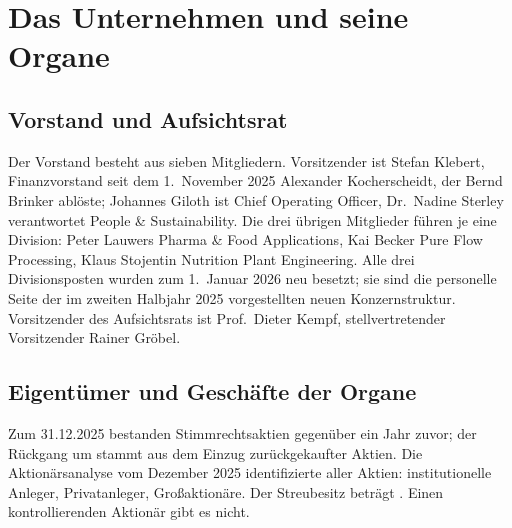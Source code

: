 \section{Das Unternehmen und seine Organe}
\label{sec:unternehmen}

\subsection{Vorstand und Aufsichtsrat}

Der Vorstand besteht aus sieben Mitgliedern. Vorsitzender ist Stefan Klebert, Finanzvorstand
seit dem 1.~November 2025 Alexander Kocherscheidt, der Bernd Brinker abl\"oste; Johannes
Giloth ist Chief Operating Officer, Dr.~Nadine Sterley verantwortet People \&
Sustainability. Die drei \"ubrigen Mitglieder f\"uhren je eine Division: Peter Lauwers
Pharma \& Food Applications, Kai Becker Pure Flow Processing, Klaus Stojentin Nutrition
Plant Engineering. Alle drei Divisionsposten wurden zum 1.~Januar 2026 neu
besetzt; sie sind die personelle Seite der im zweiten Halbjahr 2025 vorgestellten neuen
Konzernstruktur. Vorsitzender des Aufsichtsrats ist Prof.~Dieter Kempf,
stellvertretender Vorsitzender Rainer Gr\"obel.


\subsection{Eigent\"umer und Gesch\"afte der Organe}

Zum 31.12.2025 bestanden  Stimmrechtsaktien gegen\"uber
 ein Jahr zuvor; der R\"uckgang um \AktienRueckgang{} stammt aus dem
Einzug zur\"uckgekaufter Aktien. Die Aktion\"arsanalyse vom Dezember 2025
identifizierte \Pz{\IdentifiziertAnteil} aller Aktien: \Pz{\Institutionelle} institutionelle
Anleger, \Pz{\Privatanleger} Privatanleger, \Pz{\Grossaktionaere} Gro{\ss}aktion\"are. Der
Streubesitz betr\"agt \Pz{\Streubesitz}. Einen kontrollierenden Aktion\"ar gibt
es nicht.

